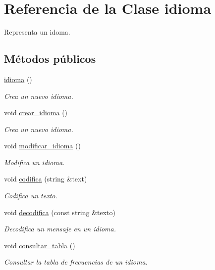\hypertarget{classidioma}{}\section{Referencia de la Clase idioma}
\label{classidioma}


Representa un idoma.  


\subsection*{Métodos públicos}
\begin{DoxyCompactItemize}
\item 
\hyperlink{classidioma_aef8714e17b1c5141104f5fb7bd989283}{idioma} ()
\begin{DoxyCompactList}\small\item\em Crea un nuevo idioma. \end{DoxyCompactList}\item 
void \hyperlink{classidioma_a40b865628fe20757e63c10cecd516c1f}{crear\+\_\+idioma} ()
\begin{DoxyCompactList}\small\item\em Crea un nuevo idioma. \end{DoxyCompactList}\item 
void \hyperlink{classidioma_af7d4b2d6a05e6b87783d9394fb1cc08e}{modificar\+\_\+idioma} ()
\begin{DoxyCompactList}\small\item\em Modifica un idioma. \end{DoxyCompactList}\item 
void \hyperlink{classidioma_ab1f4f36cf5bef660d93208ca12a08d15}{codifica} (string \&text)
\begin{DoxyCompactList}\small\item\em Codifica un texto. \end{DoxyCompactList}\item 
void \hyperlink{classidioma_a901e5b496773705624ae82bdcf15fac8}{decodifica} (const string \&texto)
\begin{DoxyCompactList}\small\item\em Decodifica un mensaje en un idioma. \end{DoxyCompactList}\item 
void \hyperlink{classidioma_a3b803dbdff20ebe884dd8e66550a856f}{consultar\+\_\+tabla} ()
\begin{DoxyCompactList}\small\item\em Consultar la tabla de frecuencias de un idioma. \end{DoxyCompactList}\item 

\end{DoxyCompactItemize}
